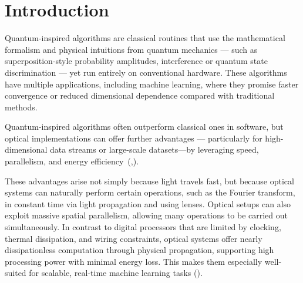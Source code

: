 \documentclass[twocolumn]{article} %
\begin{document}
\coverpage




\section{Introduction}
\label{sec:intro}

Quantum-inspired algorithms are classical routines that use the mathematical formalism and physical intuitions from quantum mechanics — such as superposition-style probability amplitudes, interference or quantum state discrimination — yet run entirely on conventional hardware.  
These algorithms have multiple applications, including machine learning, where they promise faster convergence or reduced dimensional dependence compared with traditional methods.

Quantum-inspired algorithms often outperform classical ones in software, but optical implementations can offer further advantages — particularly for high-dimensional data streams or large-scale datasets—by leveraging speed, parallelism, and energy efficiency~(\cite{Neifeld1993},\cite{Foor1995}).

These advantages arise not simply because light travels fast, but because optical systems can naturally perform certain operations, such as the Fourier transform, in constant time via light propagation and using lenses. 
Optical setups can also exploit massive spatial parallelism, allowing many operations to be carried out simultaneously. In contrast to digital processors that are limited by clocking, thermal dissipation, and wiring constraints, optical systems offer nearly dissipationless computation through physical propagation, supporting high processing power with minimal energy loss. 
This makes them especially well-suited for scalable, real-time machine learning tasks (\cite{mcmahonoptical2023}).
\end{document}
